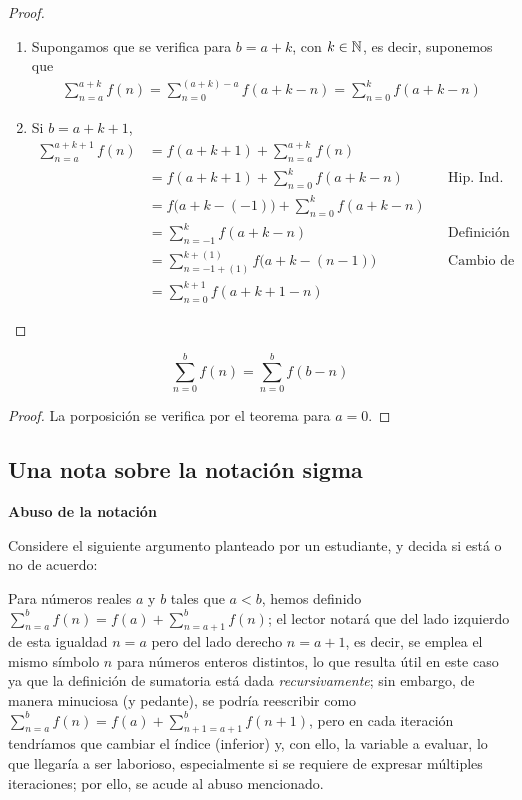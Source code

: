 \begin{enumerate}[label=\alph*)]
\begin{proof}
\begin{enumerate}[label=\Roman*)]
\begin{enumerate}[label=\roman*)]
      \item Supongamos que se verifica para $b=a+k$, con $k\in \mathbb{N}$, es decir, suponemos que
      \begin{align*}
        \sum_{n=a}^{a+k}f(n) = \sum_{n=0}^{(a+k)-a} f(a+k-n) = \sum_{n=0}^{k} f(a+k-n)
      \end{align*}

      \item Si $b=a+k+1$,
      \begin{align*}
        \sum_{n=a}^{a+k+1} f(n) &= f(a+k+1) + \sum_{n=a}^{a+k} f(n)\\
        &= f(a+k+1) + \sum_{n=0}^{k} f(a+k-n) && \text{Hip. Ind.}\\
        &= f\bigl(a+k-(-1)\bigr) + \sum_{n=0}^{k} f(a+k-n)\\
        &= \sum_{n=-1}^k f(a+k-n) && \text{Definición (de sumatoria)}\\
        &= \sum_{n=-1+(1)}^{k+(1)} f\bigl(a+k-(n-1)\bigr) && \text{Cambio de índice}\\
        &= \sum_{n=0}^{k+1} f(a+k+1-n)
      \end{align*}
      
    \end{enumerate}

    \end{enumerate}
  \end{proof}

   \[\sum_{n=0}^{b}f(n) = \sum_{n=0}^{b} f(b-n)\]

  \begin{proof}\leavevmode
    La porposición se verifica por el teorema para $a=0$.
  \end{proof}

    
  \end{enumerate}

\subsection*{Una nota sobre la notación sigma}

\textbf{Abuso de la notación}

Considere el siguiente argumento planteado por un estudiante, y decida si está o no de acuerdo:

Para números reales $a$ y $b$ tales que $a<b$, hemos definido $\sum_{n=a}^{b} f(n) = f(a) + \sum_{n=a+1}^{b}f(n)$; el lector notará que del lado izquierdo de esta igualdad $n=a$ pero del lado derecho $n=a+1$, es decir, se emplea el mismo símbolo $n$ para números enteros distintos, lo que resulta útil en este caso ya que la definición de sumatoria está dada \textit{recursivamente}; sin embargo, de manera minuciosa (y pedante), se podría reescribir como $\sum_{n=a}^{b}f(n) = f(a) + \sum_{n+1=a+1}^{b}f(n+1)$, pero en cada iteración tendríamos que cambiar el índice (inferior) y, con ello, la variable a evaluar, lo que llegaría a ser laborioso, especialmente si se requiere de expresar múltiples iteraciones; por ello, se acude al abuso mencionado.

